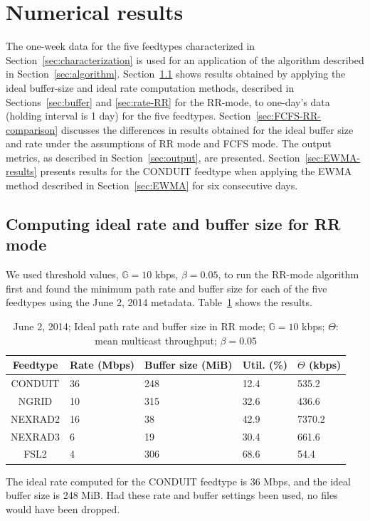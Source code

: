\section{Numerical results}
The one-week data for the five feedtypes characterized
in Section~\ref{sec:characterization} is used for an application
of the algorithm described in Section~\ref{sec:algorithm}.
Section~\ref{sec:rate-buffer}
shows results
obtained by applying the ideal buffer-size and ideal
rate computation methods, described in Sections~\ref{sec:buffer} and \ref{sec:rate-RR} for the RR-mode,
to one-day's data (holding interval is 1 day) for the five feedtypes. 
Section~\ref{sec:FCFS-RR-comparison} discusses the differences
in results obtained for the ideal buffer size and rate
under the assumptions of RR mode and FCFS mode.
The output metrics, as described in Section~\ref{sec:output},
are presented. Section~\ref{sec:EWMA-results}
presents results for the CONDUIT feedtype
when applying the EWMA method
described in Section~\ref{sec:EWMA} for six consecutive days.

\subsection{Computing ideal rate and buffer size for RR mode}
\label{sec:rate-buffer}

We used threshold values, $\mathbb{G}=10$ kbps, $\beta=0.05$,
to run the RR-mode algorithm first and found the minimum path
rate and buffer size for each of the five
feedtypes using the June 2, 2014 metadata.
Table~\ref{tab:RR-rate-buffer} shows the results.
\begin{table}
\caption{June 2, 2014; Ideal path rate and buffer size in RR mode; $\mathbb{G}=10$ kbps; $\Theta$: mean multicast throughput; $\beta=0.05$}
\centering
\begin{tabular}{| c | p{0.5in} | p{0.4in} | p{0.3in} |p{0.6in}|} \hline
Feedtype & Rate (Mbps) & Buffer size (MiB) & Util. (\%) & $\Theta$ (kbps)\\ \hline
CONDUIT & 36 & 248 & 12.4 & 535.2 \\ \hline
NGRID &10 & 315 & 32.6 &436.6  \\ \hline
NEXRAD2 & 16& 38 &42.9 &7370.2   \\ \hline
NEXRAD3 &6 & 19 &30.4 &661.6 \\ \hline
FSL2 & 4 & 306 &68.6 &54.4  \\ \hline
\end{tabular}
\label{tab:RR-rate-buffer}
\end{table}
The ideal rate computed for the CONDUIT feedtype is 36 Mbps,
and the ideal buffer size is 248 MiB. Had these rate and buffer
settings been used, no files would have been dropped.

